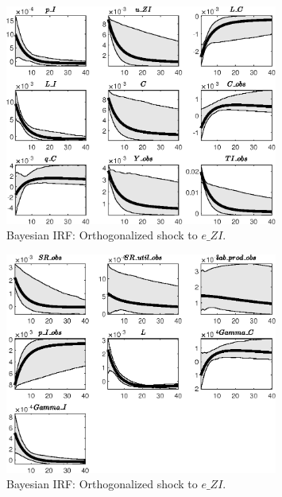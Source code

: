  
\begin{figure}[H]
\centering 
\includegraphics[width=0.80\textwidth]{directed_search/Output/directed_search_Bayesian_IRF_e_ZI_1}
\caption{Bayesian IRF: Orthogonalized shock to $e\_ZI$.}
\label{Fig:BayesianIRF:e_ZI:1}
\end{figure}
 
\begin{figure}[H]
\centering 
\includegraphics[width=0.80\textwidth]{directed_search/Output/directed_search_Bayesian_IRF_e_ZI_2}
\caption{Bayesian IRF: Orthogonalized shock to $e\_ZI$.}
\label{Fig:BayesianIRF:e_ZI:2}
\end{figure}
 
